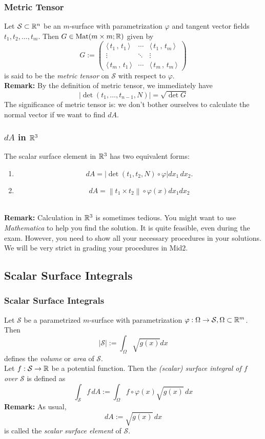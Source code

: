 \documentclass[12pt, t]{beamer}
\renewcommand{\emph}[1]{{\color{Turquoise3}\textsl{#1}}}
\newcommand{\myseries}[2]{$#1_1,#1_2,\dots,#1_#2$}
\newcommand{\nullspace}{~\\[15pt]}
\newcommand{\Remark}{\textbf{Remark: }}
\newcommand{\scp}[2]{\langle\,#1\,,\,#2\,\rangle} \newcommand{\scpp}{\langle\,\cdot\,,\,\cdot\,\rangle}
\begin{document}
\begin{frame}
    \frametitle{Metric Tensor}
    Let $\mathcal{S}\subset\mathbb{R}^n$ be an $m$-surface with parametrization $\varphi$ and tangent vector fields \myseries{t}{m}. Then $G\in\text{Mat}(m\times m;\mathbb{R})$ given by
    \[G:=\begin{pmatrix}
            \scp{t_1}{t_1} & \cdots & \scp{t_1}{t_m} \\
            \vdots         & \ddots & \vdots         \\
            \scp{t_m}{t_1} & \cdots & \scp{t_m}{t_m}
        \end{pmatrix}\]
    is said to be the \emph{metric tensor} on $\mathcal{S}$ with respect to $\varphi$.
    \nullspace
    \Remark By the definition of metric tensor, we immediately have
    $$\left|\operatorname{det}\left(t_{1}, \ldots, t_{n-1}, N\right)\right|=\sqrt{\operatorname{det} G}$$
    The significance of metric tensor is: we don't bother ourselves to calculate the normal vector if we want to find $dA$.
\end{frame}

\begin{frame}
    \frametitle{$dA$ in $\mathbb{R}^3$}
    The scalar surface element in $\mathbb{R}^3$ has two equivalent forms:
    \begin{enumerate}
        \item \[dA=|\det(t_1,t_2,N)\circ\varphi|dx_1\,dx_2.\]
        \item $$d A=\left\|t_{1} \times t_{2}\right\| \circ \varphi(x) d x_{1} d x_{2}$$
    \end{enumerate}
    \nullspace
    \Remark Calculation in $\mathbb{R}^3$ is sometimes tedious. You might want to use \textit{Mathematica} to help you find the solution. It is quite feasible, even during the exam. However, you need to show all your necessary procedures in your solutions. We will be very strict in grading your procedures in Mid2.
\end{frame}

\subsection{Scalar Surface Integrals}
\begin{frame}
    \frametitle{Scalar Surface Integrals}
    Let $\mathcal{S}$ be a parametrized $m$-surface with parametrization $\varphi:\Omega\to\mathcal{S},\Omega\subset\mathbb{R}^m$. Then
    \[|\mathcal{S}|:=\int_\Omega\sqrt{g(x)}dx\]
    defines the \emph{volume} or \emph{area} of $\mathcal{S}$.\\[4pt]
    Let $f:\mathcal{S}\to\mathbb{R}$ be a potential function. Then the \emph{(scalar) surface integral of $f$ over $\mathcal{S}$} is defined as
    \[\int_\mathcal{S}f\,dA:=\int_\Omega f\circ\varphi(x)\sqrt{g(x)}\,dx\]
    \Remark As usual,
    \[dA:=\sqrt{g(x)}\,dx\]
    is called the \emph{scalar surface element} of $\mathcal{S}$.
\end{frame}
\end{document}
